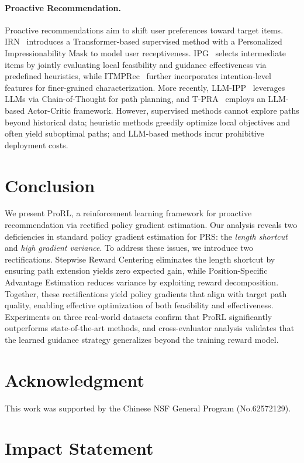 \documentclass{llmxive}
\begin{document}
\paragraph{Proactive Recommendation.}
Proactive recommendations aim to shift user preferences toward target items. IRN~\cite{zhu2023influential} introduces a Transformer-based supervised method with a Personalized Impressionability Mask to model user receptiveness. IPG~\cite{bi2024proactive} selects intermediate items by jointly evaluating local feasibility and guidance effectiveness via predefined heuristics, while ITMPRec~\cite{lian2025itmprec} further incorporates intention-level features for finer-grained characterization. More recently, LLM-IPP~\cite{wang2025leveraging} leverages LLMs via Chain-of-Thought for path planning, and T-PRA~\cite{wang2025tunable} employs an LLM-based Actor-Critic framework. However, supervised methods cannot explore paths beyond historical data; heuristic methods greedily optimize local objectives and often yield suboptimal paths; and LLM-based methods incur prohibitive deployment costs.
\section{Conclusion}
We present ProRL, a reinforcement learning framework for proactive 
recommendation via rectified policy gradient estimation. Our analysis reveals two deficiencies in standard policy gradient estimation for PRS: the \emph{length shortcut} and \emph{high gradient variance}. To address these issues, we introduce two rectifications. Stepwise Reward Centering eliminates the length shortcut by ensuring path extension yields zero expected gain, while Position-Specific Advantage Estimation reduces variance by exploiting reward decomposition. Together, these rectifications yield policy gradients that align with target path quality, enabling effective optimization of both feasibility and effectiveness. Experiments on three real-world datasets confirm that ProRL significantly outperforms state-of-the-art methods, and cross-evaluator analysis validates that the learned guidance strategy generalizes beyond the training reward model.
\section*{Acknowledgment}

This work was supported by the Chinese NSF General Program (No.62572129).

\section*{Impact Statement}
\end{document}
